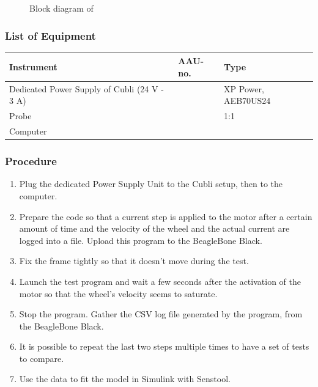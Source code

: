 \begin{figure}[H]
  
  \caption{Block diagram of}
  \label{Parameters}
\end{figure}


\subsubsection{List of Equipment}
\begin{table}[H]
  \begin{tabular}{|l|l|p{4.3cm}|}
    \hline%
    \textbf{Instrument}                                   &  \textbf{AAU-no.} &  \textbf{Type}            \\
    \hline%
    Dedicated Power Supply of Cubli \small{(24 V - 3 A)}  &                   &  XP Power, AEB70US24      \\
    \hline%
    Probe                                                 &                   &  1:1                      \\
    \hline%
    Computer                                              &                   &                           \\
    \hline%
  \end{tabular}
\end{table}

\subsubsection{Procedure}
\begin{enumerate}
  \item Plug the dedicated Power Supply Unit to the Cubli setup, then to the computer.
  \item Prepare the code so that a current step is applied to the motor after a certain amount of time and the velocity of the wheel and the actual current are logged into a file. Upload this program to the BeagleBone Black.
  \item Fix the frame tightly so that it doesn't move during the test.
  \item Launch the test program and wait a few seconds after the activation of the motor so that the wheel's velocity seems to saturate.
  \item Stop the program. Gather the CSV log file generated by the program, from the BeagleBone Black.
  \item It is possible to repeat the last two steps multiple times to have a set of tests to compare.
  \item Use the data to fit the model in Simulink with Senstool.
\end{enumerate}